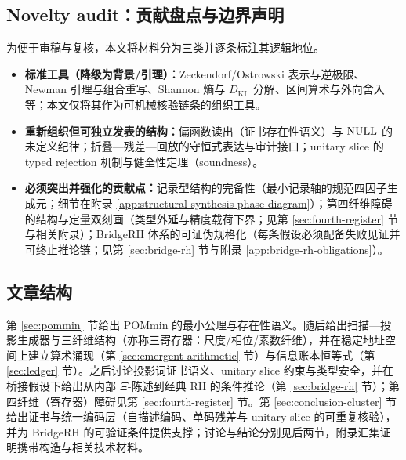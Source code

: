 \subsection{Novelty audit：贡献盘点与边界声明}
为便于审稿与复核，本文将材料分为三类并逐条标注其逻辑地位。\par
\begin{itemize}
  \item \textbf{标准工具（降级为背景/引理）：}Zeckendorf/Ostrowski 表示与逆极限、Newman 引理与组合重写、Shannon 熵与 $D_{\mathrm{KL}}$ 分解、区间算术与外向舍入等；本文仅将其作为可机械核验链条的组织工具。
  \item \textbf{重新组织但可独立发表的结构：}偏函数读出（证书存在性语义）与 $\mathrm{NULL}$ 的未定义纪律；折叠—残差—回放的守恒式表达与审计接口；unitary slice 的 typed rejection 机制与健全性定理（soundness）。
  \item \textbf{必须突出并强化的贡献点：}记录型结构的完备性（最小记录轴的规范四因子生成元；细节在附录 \ref{app:structural-synthesis-phase-diagram}）；第四纤维障碍的结构与定量双刻画（类型外延与精度载荷下界；见第 \ref{sec:fourth-register} 节与相关附录）；BridgeRH 体系的可证伪规格化（每条假设必须配备失败见证并可终止推论链；见第 \ref{sec:bridge-rh} 节与附录 \ref{app:bridge-rh-obligations}）。
\end{itemize}

\subsection{文章结构}
第 \ref{sec:pommin} 节给出 POMmin 的最小公理与存在性语义。随后给出扫描—投影生成器与三纤维结构（亦称三寄存器：尺度/相位/素数纤维），并在稳定地址空间上建立算术涌现（第 \ref{sec:emergent-arithmetic} 节）与信息账本恒等式（第 \ref{sec:ledger} 节）。之后讨论投影词证书语义、unitary slice 约束与类型安全，并在桥接假设下给出从内部 $\Xi$-陈述到经典 RH 的条件推论（第 \ref{sec:bridge-rh} 节）；第四纤维（寄存器）障碍见第 \ref{sec:fourth-register} 节。第 \ref{sec:conclusion-cluster} 节给出证书与统一编码层（自描述编码、单码残差与 unitary slice 的可重复核验），并为 BridgeRH 的可验证条件提供支撑；讨论与结论分别见后两节，附录汇集证明携带构造与相关技术材料。

